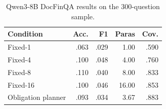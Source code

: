 \documentclass[11pt]{article}
\begin{document}
\begin{table}[t]
\centering
\small
\setlength{\tabcolsep}{3pt}
\caption{Qwen3-8B DocFinQA results on the 300-question sample.}
\label{tab:qwendoc}
\begin{tabular}{lrrrr}
\toprule
Condition & Acc. & F1 & Paras & Cov. \\
\midrule
Fixed-1 & .063 & .029 & 1.00 & .590 \\
Fixed-4 & .100 & .048 & 4.00 & .760 \\
Fixed-8 & .110 & .040 & 8.00 & .833 \\
Fixed-16 & .100 & .046 & 16.00 & .853 \\
Obligation planner & .093 & .034 & 3.67 & .883 \\
\bottomrule
\end{tabular}
\end{table}
\end{document}
